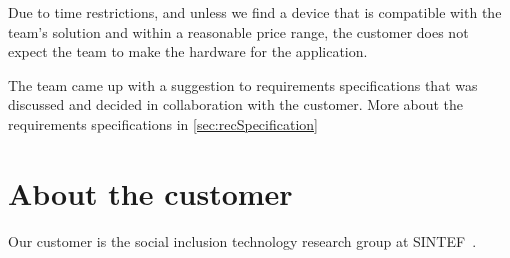 Due to time restrictions, and unless we find a device that is compatible with the team's solution and within a reasonable price range, the customer does not expect the team to make the hardware for the application.

The team came up with a suggestion to requirements specifications that was discussed and decided in collaboration with the customer. More about the requirements specifications in \ref{sec:recSpecification}

\section{About the customer}

Our customer is the social inclusion technology research group at SINTEF~\cite{sintef}.











 


